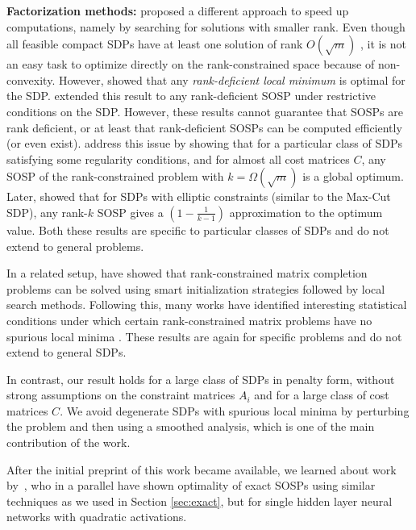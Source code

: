\noindent \textbf{Factorization methods:}
\citet{burer2003nonlinear, burer2005local} proposed a different approach to speed up computations, namely by searching for solutions with smaller rank.  Even though all feasible compact SDPs have at least one solution of rank $O(\sqrt{m})$ \citep{barvinok1995problems, pataki1998rank}, it is not an easy task to optimize directly on the rank-constrained space because of non-convexity. However,  \citet{burer2003nonlinear, burer2005local} showed that any \emph{rank-deficient local minimum} is optimal for the SDP. \citet{journee2010low} extended this result to any rank-deficient SOSP under restrictive conditions on the SDP. However, these results cannot guarantee that SOSPs are rank deficient, or at least that rank-deficient SOSPs can be computed efficiently (or even exist). \citet{boumal2016non,boumal2018deterministicbm} address this issue by showing that for a particular class of SDPs satisfying some regularity conditions, and for almost all cost matrices $C$, any SOSP of the rank-constrained problem with $k = \Omega(\sqrt{m})$ is a global optimum. Later, \citet{pmlr-v65-mei17a} showed that for SDPs with elliptic constraints (similar to the Max-Cut SDP), any rank-$k$ SOSP gives a $(1-\frac{1}{k-1})$ approximation to the optimum value. Both these results are specific to particular classes of SDPs and do not extend to general problems.
 
In a related setup, \citet{keshavan2010matrix, jain2013low} have showed that rank-constrained matrix completion problems can be solved using smart initialization strategies followed by local search methods. Following this, many works have identified interesting statistical conditions under which certain rank-constrained matrix problems have no spurious local minima \citep{ sun2016geometric, bandeira2016low, ge2016matrix, bhojanapalli2016global, park2017non, ge2017no, zhu2017global, ge2017optimization}.  These results are again for specific problems and do not extend to general SDPs.

In contrast, our result holds for a large class of SDPs in penalty form, without strong assumptions on the constraint matrices $A_i$ and for a large class of cost matrices $C$. We avoid degenerate SDPs with spurious local minima by perturbing the problem and then using a smoothed analysis, which is one of the main contribution of the work. 

After the initial preprint of this work became available, we learned about work by~\citet{du2018power}, who in a parallel have shown optimality of exact SOSPs using similar techniques as we used in Section \ref{sec:exact}, but for single hidden layer neural networks with quadratic activations.


